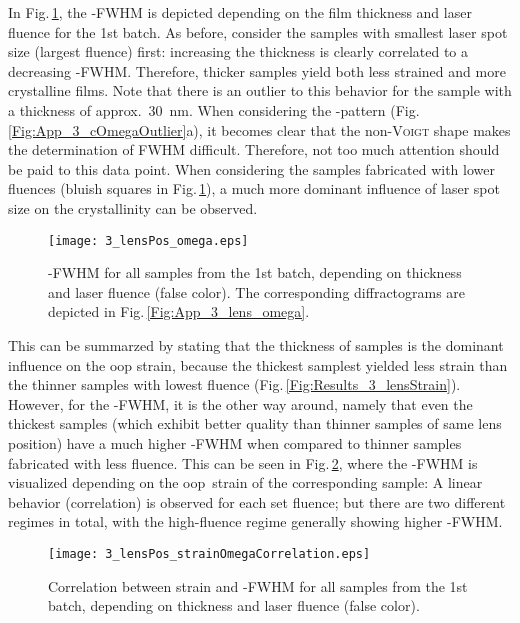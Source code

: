 In Fig.\,\ref{Fig:Results_3_lensOmega}, the \textomega-FWHM is depicted depending on the film thickness and laser fluence for the 1st batch.
As before, consider the samples with smallest laser spot size (largest fluence) first:
increasing the thickness is clearly correlated to a decreasing \textomega-FWHM.
Therefore, thicker samples yield both less strained and more crystalline films.
Note that there is an outlier to this behavior for the sample with a thickness of approx.\ \qty{30}{\nm}.
When considering the \textomega-pattern (Fig.\,\ref{Fig:App_3_cOmegaOutlier}a), it becomes clear that the non-\textsc{Voigt} shape makes the determination of \gls{FWHM} difficult.
Therefore, not too much attention should be paid to this data point.
When considering the samples fabricated with lower fluences (bluish squares in Fig.\,\ref{Fig:Results_3_lensOmega}), a much more dominant influence of laser spot size on the crystallinity can be observed.
\begin{figure}
    \centering
    \texttt{[image: 3\_lensPos\_omega.eps]}
    \caption{
        \textomega-FWHM for all samples from the 1st batch, depending on thickness and laser fluence (false color).
        The corresponding diffractograms are depicted in Fig.\,\ref{Fig:App_3_lens_omega}.
    }
    \label{Fig:Results_3_lensOmega}
\end{figure}
This can be summarzed by stating that the thickness of samples is the dominant influence on the \gls{oop} strain, because the thickest samplest yielded less strain than the thinner samples with lowest fluence (Fig.\,\ref{Fig:Results_3_lensStrain}).
However, for the \textomega-FWHM, it is the other way around, namely that even the thickest samples (which exhibit better quality than thinner samples of same lens position) have a much higher \textomega-FWHM when compared to thinner samples fabricated with less fluence.
This can be seen in Fig.\,\ref{Fig:Results_3_lensCorrelation}, where the \textomega-FWHM is visualized depending on the \gls{oop}\ strain of the corresponding sample:
A linear behavior (correlation) is observed for each set fluence; but there are two different regimes in total, with the high-fluence regime generally showing higher \textomega-FWHM.
\begin{figure}
    \centering
    \texttt{[image: 3\_lensPos\_strainOmegaCorrelation.eps]}
    \caption{
        Correlation between strain and \textomega-FWHM for all samples from the 1st batch, depending on thickness and laser fluence (false color).
    }
    \label{Fig:Results_3_lensCorrelation}
\end{figure}
